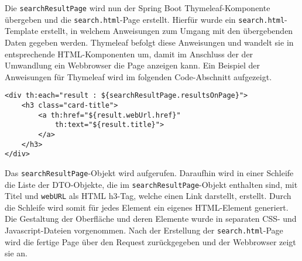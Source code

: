 Die \texttt{searchResultPage} wird nun der Spring Boot Thymeleaf-Komponente übergeben und die \texttt{search.html}-Page erstellt.
Hierfür wurde ein \texttt{search.html}-Template erstellt, in welchem Anweisungen zum Umgang mit den übergebenden Daten gegeben werden.
Thymeleaf befolgt diese Anweisungen und wandelt sie in entsprechende HTML-Komponenten um, damit im Anschluss der der Umwandlung ein Webbrowser die Page anzeigen kann.
Ein Beispiel der Anweisungen für Thymeleaf wird im folgenden Code-Abschnitt aufgezeigt.

\begin{lstlisting}
<div th:each="result : ${searchResultPage.resultsOnPage}">
	<h3 class="card-title">
		<a th:href="${result.webUrl.href}"
			th:text="${result.title}">
		</a>
	</h3>
</div>
\end{lstlisting}

Das \texttt{searchResultPage}-Objekt wird aufgerufen.
Daraufhin wird in einer Schleife die Liste der DTO-Objekte, die im \texttt{searchResultPage}-Objekt enthalten sind, mit Titel und \texttt{webURL} als HTML h3-Tag, welche einen Link darstellt, erstellt.
Durch die Schleife wird somit für jedes Element ein eigenes HTML-Element generiert.
Die Gestaltung der Oberfläche und deren Elemente wurde in separaten CSS- und Javascript-Dateien vorgenommen.
Nach der Erstellung der \texttt{search.html}-Page wird die fertige Page über den Request zurückgegeben und der Webbrowser zeigt sie an.